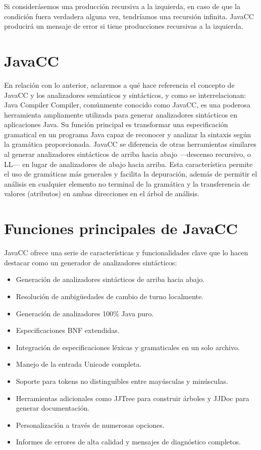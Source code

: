 Si considerásemos una producción recursiva a la izquierda, en caso de que la  condición fuera verdadera alguna vez, tendríamos una recursión infinita.
JavaCC producirá un mensaje de error si tiene producciones recursivas a la izquierda.

\section{JavaCC}
\noindent En relación con lo anterior, aclaremos a qué hace referencia el concepto de JavaCC y los analizadores semánticos y sintácticos, y como se interrelacionan:
Java Compiler Compiler, comúnmente conocido como JavaCC, es una poderosa herramienta ampliamente utilizada para generar analizadores sintácticos en aplicaciones Java. Su función principal es transformar una especificación gramatical en un programa Java capaz de reconocer y analizar la sintaxis según la gramática proporcionada.
JavaCC se diferencia de otras herramientas similares al generar analizadores sintácticos de arriba hacia abajo ---descenso recursivo, o LL--- en lugar de analizadores de abajo hacia arriba. Esta característica permite el uso de gramáticas más generales y facilita la depuración, además de permitir el análisis en cualquier elemento no terminal de la gramática y la transferencia de valores (atributos) en ambas direcciones en el árbol de análisis.

\section{Funciones principales de JavaCC}
\noindent JavaCC ofrece una serie de características y funcionalidades clave que lo hacen destacar como un generador de analizadores sintácticos:
\begin{itemize}
	\item Generación de analizadores sintácticos de arriba hacia abajo.
	\item Resolución de ambigüedades de cambio de turno localmente.
	\item Generación de analizadores 100\% Java puro.
	\item Especificaciones BNF extendidas.
	\item Integración de especificaciones léxicas y gramaticales en un solo archivo.
	\item Manejo de la entrada Unicode completa.
	\item Soporte para tokens no distinguibles entre mayúsculas y minúsculas.
	\item Herramientas adicionales como JJTree para construir árboles y JJDoc para generar documentación.
	\item Personalización a través de numerosas opciones.
	\item Informes de errores de alta calidad y mensajes de diagnóstico completos.
\end{itemize}

